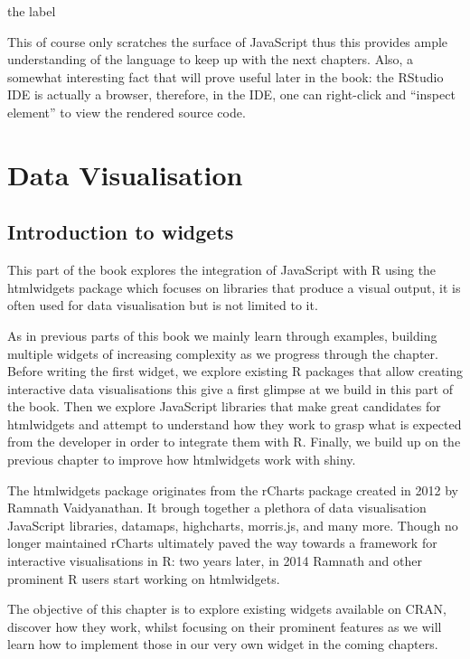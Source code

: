 \documentclass[
]{krantz}
\begin{document}
the label

This of course only scratches the surface of JavaScript thus this provides ample understanding of the language to keep up with the next chapters. Also, a somewhat interesting fact that will prove useful later in the book: the RStudio IDE is actually a browser, therefore, in the IDE, one can right-click and ``inspect element'' to view the rendered source code.

\hypertarget{part-data-visualisation}{%
\part{Data Visualisation}\label{part-data-visualisation}}

\hypertarget{introduction-to-widgets}{%
\chapter{Introduction to widgets}\label{introduction-to-widgets}}

This part of the book explores the integration of JavaScript with R using the htmlwidgets package which focuses on libraries that produce a visual output, it is often used for data visualisation but is not limited to it.

As in previous parts of this book we mainly learn through examples, building multiple widgets of increasing complexity as we progress through the chapter. Before writing the first widget, we explore existing R packages that allow creating interactive data visualisations this give a first glimpse at we build in this part of the book. Then we explore JavaScript libraries that make great candidates for htmlwidgets and attempt to understand how they work to grasp what is expected from the developer in order to integrate them with R. Finally, we build up on the previous chapter to improve how htmlwidgets work with shiny.

The htmlwidgets package originates from the rCharts \citep{R-rCharts} package created in 2012 by Ramnath Vaidyanathan. It brough together a plethora of data visualisation JavaScript libraries, datamaps, highcharts, morris.js, and many more. Though no longer maintained rCharts ultimately paved the way towards a framework for interactive visualisations in R: two years later, in 2014 Ramnath and other prominent R users start working on htmlwidgets.

The objective of this chapter is to explore existing widgets available on CRAN, discover how they work, whilst focusing on their prominent features as we will learn how to implement those in our very own widget in the coming chapters.
\end{document}
